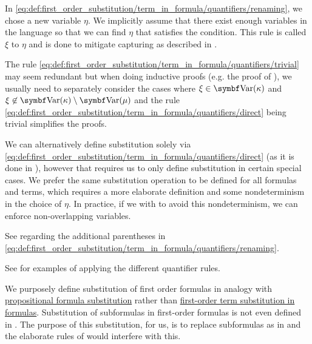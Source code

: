 \begin{definition}
\begin{defenum}
    In \eqref{eq:def:first_order_substitution/term_in_formula/quantifiers/renaming}, we chose a new variable \( \eta \). We implicitly assume that there exist enough variables in the language so that we can find \( \eta \) that satisfies the condition. This rule is called  \( \xi \) to \( \eta \) and is done to mitigate capturing as described in .

    The rule \eqref{eq:def:first_order_substitution/term_in_formula/quantifiers/trivial} may seem redundant but when doing inductive proofs (e.g. the proof of ), we usually need to separately consider the cases where \( \xi \in \bfop{Var}(\kappa) \) and \( \xi \not\in \bfop{Var}(\kappa) \setminus \bfop{Var}(\mu) \) and the rule \eqref{eq:def:first_order_substitution/term_in_formula/quantifiers/direct} being trivial simplifies the proofs.

    We can alternatively define substitution solely via \eqref{eq:def:first_order_substitution/term_in_formula/quantifiers/direct} (as it is done in \cite[def. 14.25]{OpenLogic20201202}), however that requires us to only define substitution in certain special cases. We prefer the same substitution operation to be defined for all formulas and terms, which requires a more elaborate definition and some nondeterminism in the choice of \( \eta \). In practice, if we with to avoid this nondeterminism, we can enforce non-overlapping variables.

    See  regarding the additional parentheses in \eqref{eq:def:first_order_substitution/term_in_formula/quantifiers/renaming}.

    See  for examples of applying the different quantifier rules.

     We purposely define substitution of first order formulas in analogy with \hyperref[def:propositional_substitution/single]{propositional formula substitution} rather than \hyperref[def:first_order_substitution/term_in_formula]{first-order term substitution in formulas}. Substitution of subformulas in first-order formulas is not even defined in \cite{OpenLogic20201202}. The purpose of this substitution, for us, is to replace subformulas as in  and the elaborate rules of  would interfere with this.


\end{defenum}
\end{definition}
